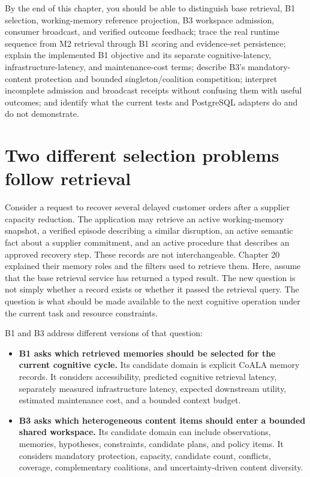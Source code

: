 \begin{learningbox}
By the end of this chapter, you should be able to distinguish base retrieval, B1 selection, working-memory reference projection, B3 workspace admission, consumer broadcast, and verified outcome feedback; trace the real runtime sequence from M2 retrieval through B1 scoring and evidence-set persistence; explain the implemented B1 objective and its separate cognitive-latency, infrastructure-latency, and maintenance-cost terms; describe B3's mandatory-content protection and bounded singleton/coalition competition; interpret incomplete admission and broadcast receipts without confusing them with useful outcomes; and identify what the current tests and PostgreSQL adapters do and do not demonstrate.
\end{learningbox}

\section{Two different selection problems follow retrieval}
\label{sec:ch21-two-selection-problems}

Consider a request to recover several delayed customer orders after a supplier capacity reduction. The application may retrieve an active working-memory snapshot, a verified episode describing a similar disruption, an active semantic fact about a supplier commitment, and an active procedure that describes an approved recovery step. These records are not interchangeable. Chapter 20 explained their memory roles and the filters used to retrieve them. Here, assume that the base retrieval service has returned a typed result. The new question is not simply whether a record exists or whether it passed the retrieval query. The question is what should be made available to the next cognitive operation under the current task and resource constraints.

B1 and B3 address different versions of that question:

\begin{itemize}
  \item \textbf{B1 asks which retrieved memories should be selected for the current cognitive cycle.} Its candidate domain is explicit CoALA memory records. It considers accessibility, predicted cognitive retrieval latency, separately measured infrastructure latency, expected downstream utility, estimated maintenance cost, and a bounded context budget.
  \item \textbf{B3 asks which heterogeneous content items should enter a bounded shared workspace.} Its candidate domain can include observations, memories, hypotheses, constraints, candidate plans, and policy items. It considers mandatory protection, capacity, candidate count, conflicts, coverage, complementary coalitions, and uncertainty-driven content diversity.
\end{itemize}

